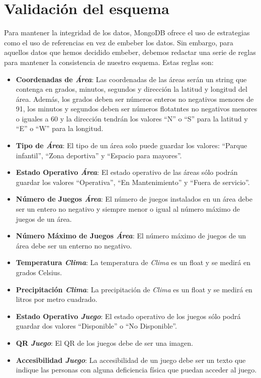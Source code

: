 \documentclass[]{article}
\begin{document}
\section{Validación del esquema}
\label{sec:esquema}
Para mantener la integridad de los datos, MongoDB ofrece el uso de estrategias como el uso de referencias en vez de embeber los datos. Sin embargo, para aquellos datos que hemos decidido embeber, debemos redactar una serie de reglas para mantener la consistencia de nuestro esquema. Estas reglas son:
\begin{itemize}
    \item \textbf{Coordenadas de \textit{Área}}: Las coordenadas de las áreas serán un string que contenga en grados, minutos, segundos y dirección la latitud y longitud del área. Además, los grados deben ser números enteros no negativos menores de 91, los minutos y segundos deben ser números flotatntes no negativos menores o iguales a 60 y la dirección tendrán los valores ``N'' o ``S'' para la latitud y ``E'' o ``W'' para la longitud.
    \item \textbf{Tipo de \textit{Área}}: El tipo de un área solo puede guardar los valores: ``Parque infantil'', ``Zona deportiva'' y ``Espacio para mayores''.
    \item \textbf{Estado Operativo \textit{Área}}: El estado operativo de las áreas sólo podrán guardar los valores ``Operativa'', ``En Mantenimiento'' y ``Fuera de servicio''.
    \item \textbf{Número de Juegos \textit{Área}}: El número de juegos instalados en un área debe ser un entero no negativo y siempre menor o igual al número máximo de juegos de un área.
    \item \textbf{Número Máximo de Juegos \textit{Área}}: El número máximo de juegos de un área debe ser un enterno no negativo.
    \item \textbf{Temperatura \textit{Clima}}: La temperatura de \textit{Clima} es un float y se medirá en grados Celsius.
    \item \textbf{Precipitación \textit{Clima}}: La precipitación de \textit{Clima} es un float y se medirá en litros por metro cuadrado.
    \item \textbf{Estado Operativo \textit{Juego}}: El estado operativo de los juegos sólo podrá guardar dos valores ``Disponible'' o ``No Disponible''.
    \item \textbf{QR \textit{Juego}}: El QR de los juegos debe de ser una imagen.
    \item \textbf{Accesibilidad \textit{Juego}}: La accesibilidad de un juego debe ser un texto que indique las personas con alguna deficiencia física que puedan acceder al juego.

\end{itemize}
\end{document}
